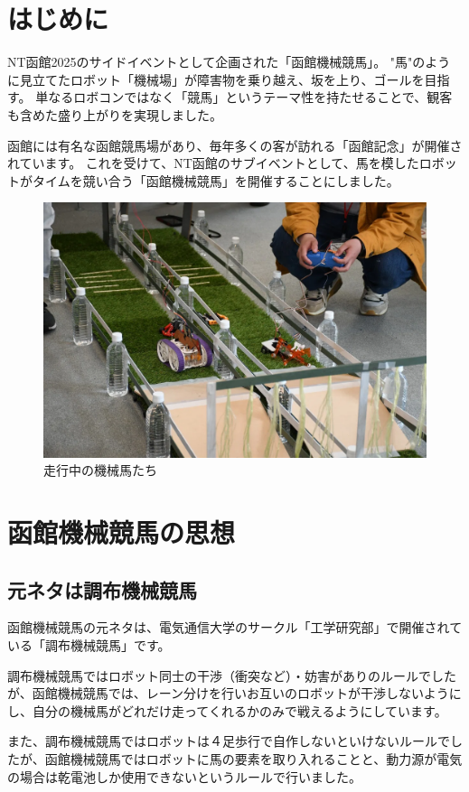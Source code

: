\chapter{はじめに}
NT函館2025のサイドイベントとして企画された「函館機械競馬」。  
"馬"のように見立てたロボット「機械場」が障害物を乗り越え、坂を上り、ゴールを目指す。  
単なるロボコンではなく「競馬」というテーマ性を持たせることで、観客も含めた盛り上がりを実現しました。

函館には有名な函館競馬場があり、毎年多くの客が訪れる「函館記念」が開催されています。  
これを受けて、NT函館のサブイベントとして、馬を模したロボットがタイムを競い合う「函館機械競馬」を開催することにしました。

\begin{figure}[h]
\centering
\includegraphics[width=0.7\linewidth]{pages/images/course.png}
\caption{走行中の機械馬たち}
\end{figure}

\chapter{函館機械競馬の思想}
\section{元ネタは調布機械競馬}
函館機械競馬の元ネタは、電気通信大学のサークル「工学研究部」で開催されている「調布機械競馬」です。

調布機械競馬ではロボット同士の干渉（衝突など）・妨害がありのルールでしたが、函館機械競馬では、レーン分けを行いお互いのロボットが干渉しないようにし、自分の機械馬がどれだけ走ってくれるかのみで戦えるようにしています。

また、調布機械競馬ではロボットは４足歩行で自作しないといけないルールでしたが、函館機械競馬ではロボットに馬の要素を取り入れることと、動力源が電気の場合は乾電池しか使用できないというルールで行いました。

